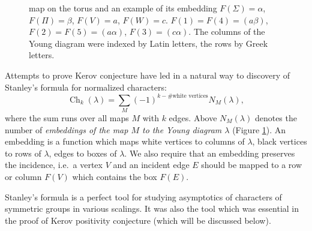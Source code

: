 \documentclass{emsprocart}
\theoremstyle{definition}
\begin{document}
\begin{figure}
{
\label{subfig:embed}}

\caption{\protect{} map on the torus and 
\protect{} an example of its embedding 
$F(\Sigma)=\alpha$, $F(\Pi)=\beta$, $F(V)=a$, $F(W)=c$.
$F(1)=F(4)=(a \beta)$, $F(2)=F(5)=(a \alpha)$, $F(3)=(c\alpha)$.
The columns of the Young diagram were indexed by Latin letters, the rows by Greek letters.}
\label{fig:embedding}
\end{figure}

Attempts to prove Kerov conjecture have led in a natural way to discovery of
Stanley's formula for normalized characters:
$$ \operatorname{Ch}_k(\lambda)= \sum_{M} (-1)^{k-\#\text{white vertices}} N_M(\lambda), $$
where the sum runs over all maps $M$ with $k$ edges.
Above $N_M(\lambda)$ denotes the number of \emph{embeddings of the map $M$ to the
Young diagram $\lambda$} (Figure \ref{fig:embedding}).
An embedding is a function which maps white vertices to columns of $\lambda$, black vertices to rows
of $\lambda$, edges to boxes of $\lambda$. We also require that an embedding preserves the incidence,
i.e.~a vertex $V$ and an incident edge $E$ should be mapped to a row or column $F(V)$ which contains the box
$F(E)$. 

Stanley's formula is a perfect tool for studying asymptotics of characters of symmetric groups in various scalings.
It was also the tool which was essential in the proof of Kerov positivity conjecture (which will be discussed below).
\end{document}
